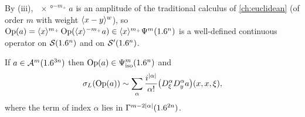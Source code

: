 By (iii), $\ang{x}^{-m_+}a$ is an amplitude of the traditional calculus of
\cref{ch:euclidean} (of order $m$ with weight $\langle x-y\rangle^w$), so
$\operatorname{Op}(a)=\langle x\rangle^{m_+}\operatorname{Op}(\langle x\rangle^{-m_+}a)\in\langle x\rangle^{m_+}\Psi^{m}(1.6^n)$ is a
well-defined continuous operator on $\mathcal{S}(1.6^n)$ and on $\mathcal{S}'(1.6^n)$.

\begin{proposition}[Reduction]\label{isotropic:prop:reduction}
If $a\in\mathcal{A}^{m}(1.6^{3n})$ then $\operatorname{Op}(a)\in\Psi^{m}_{\mathrm{iso}}(1.6^n)$ and
\begin{equation}\label{isotropic:eq:left-reduction}
  \sigma_L(\operatorname{Op}(a))\sim\sum_\alpha\frac{i^{|\alpha|}}{\alpha!}\bigl(D_\xi^\alpha D_y^\alpha a\bigr)(x,x,\xi),
\end{equation}
where the term of index $\alpha$ lies in $\Gamma^{m-2|\alpha|}(1.6^{2n})$.
\end{proposition}

